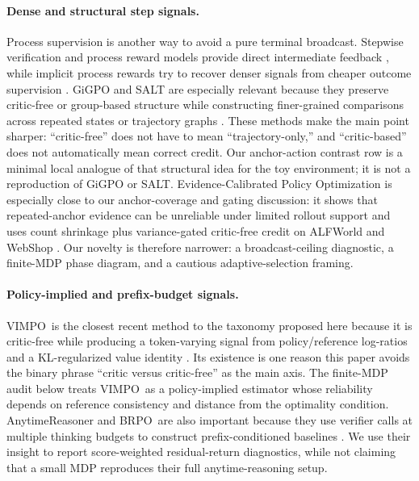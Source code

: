\documentclass[11pt]{article}
\newcommand{\vimpo}{\textsc{VIMPO}}
\newcommand{\brpo}{\textsc{BRPO}}
\begin{document}
\paragraph{Dense and structural step signals.}
Process supervision is another way to avoid a pure terminal broadcast. Stepwise
verification and process reward models provide direct intermediate feedback
\citep{lightman2023verify,wang2023mathshepherd}, while implicit process rewards
try to recover denser signals from cheaper outcome supervision
\citep{yuan2024freeprocess}. GiGPO and SALT are especially relevant because
they preserve critic-free or group-based structure while constructing
finer-grained comparisons across repeated states or trajectory graphs
\citep{feng2025gigpo,li2025salt}. These methods make the main point sharper:
``critic-free'' does not have to mean ``trajectory-only,'' and ``critic-based''
does not automatically mean correct credit. Our anchor-action contrast row is a
minimal local analogue of that structural idea for the toy environment; it is
not a reproduction of GiGPO or SALT.
Evidence-Calibrated Policy Optimization is especially close to our
anchor-coverage and gating discussion: it shows that repeated-anchor evidence
can be unreliable under limited rollout support and uses count shrinkage plus
variance-gated critic-free credit on ALFWorld and WebShop
\citep{li2026ecpo}. Our novelty is therefore narrower: a broadcast-ceiling
diagnostic, a finite-MDP phase diagram, and a cautious adaptive-selection
framing.

\paragraph{Policy-implied and prefix-budget signals.}
\vimpo\ is the closest recent method to the taxonomy proposed here because it
is critic-free while producing a token-varying signal from policy/reference
log-ratios and a KL-regularized value identity \citep{kang2026vimpo}. Its
existence is one reason this paper avoids the binary phrase ``critic versus
critic-free'' as the main axis. The finite-MDP audit below treats \vimpo\ as a
policy-implied estimator whose reliability depends on reference consistency and
distance from the optimality condition. AnytimeReasoner and \brpo\ are also
important because they use verifier calls at multiple thinking budgets to
construct prefix-conditioned baselines \citep{qi2025anytimereasoner}. We use
their insight to report score-weighted residual-return diagnostics, while not
claiming that a small MDP reproduces their full anytime-reasoning setup.
\end{document}

